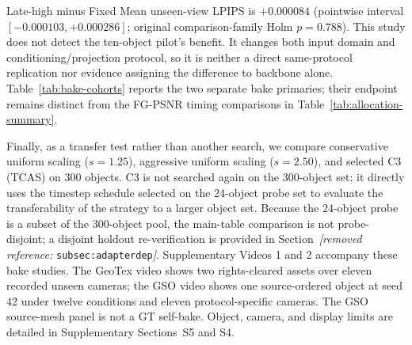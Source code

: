 \documentclass[times,twocolumn,final]{elsarticle}
\providecommand{\DIFadd}[1]{{\protect\color{blue} \sf #1}} %
\providecommand{\DIFdel}[1]{{\protect\color{red} \scriptsize #1}} %
\providecommand{\DIFaddbegin}{} %
\providecommand{\DIFaddend}{} %
\providecommand{\DIFdelbegin}{} %
\providecommand{\DIFdelend}{} %
\begin{document}
\DIFdelend \DIFaddbegin \DIFadd{Late-high minus Fixed Mean unseen-view LPIPS is $+0.000084$ (pointwise interval $[-0.000103,+0.000286]$; original comparison-family Holm $p=0.788$). This study does not detect the ten-object pilot's benefit. It changes both input domain and conditioning/projection protocol, so it is neither a direct same-protocol replication nor evidence assigning the difference to backbone alone. Table~\ref{tab:bake-cohorts} reports the two separate bake primaries; their endpoint remains distinct from the FG-PSNR timing comparisons in Table~\ref{tab:allocation-summary}.
}\DIFaddend

\DIFdelbegin \DIFdel{Finally, as a transfer test rather than another search, we compare conservative uniform scaling ($s = 1.25$), aggressive uniform scaling ($s = 2.50$), and selected C3 (TCAS) on 300 objects. C3 is not searched again on the 300-object set; it directly uses the timestep schedule selected on the 24-object probe set to evaluate the transferability of the strategy to a larger object set. Because the 24-object probe is a subset of the 300-object pool, the main-table comparison is not probe-disjoint; a disjoint holdout re-verification is provided in Section~\textit{[removed reference: }\texttt{subsec:adapterdep}\textit{]}. }\DIFdelend \DIFaddbegin \DIFadd{Supplementary Videos 1 and 2 accompany these bake studies. The GeoTex video shows two rights-cleared assets over eleven recorded unseen cameras; the GSO video shows one source-ordered object at seed 42 under twelve conditions and eleven protocol-specific cameras. The GSO source-mesh panel is not a GT self-bake. Object, camera, and display limits are detailed in Supplementary Sections~S5 and S4.
}\DIFaddend
\end{document}
